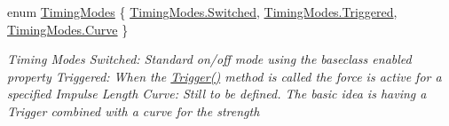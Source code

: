 \begin{DoxyCompactItemize}
enum \hyperlink{class_farseer_physics_1_1_controllers_1_1_abstract_force_controller_a5dc6c4b2c041b7c5c084873d89b4b62b}{Timing\+Modes} \{ \hyperlink{class_farseer_physics_1_1_controllers_1_1_abstract_force_controller_a5dc6c4b2c041b7c5c084873d89b4b62bae95589f4d6357f5680d489ad6997f338}{Timing\+Modes.\+Switched}, 
\hyperlink{class_farseer_physics_1_1_controllers_1_1_abstract_force_controller_a5dc6c4b2c041b7c5c084873d89b4b62ba073b1bbd5b71098e61f7c3b8240a29bf}{Timing\+Modes.\+Triggered}, 
\hyperlink{class_farseer_physics_1_1_controllers_1_1_abstract_force_controller_a5dc6c4b2c041b7c5c084873d89b4b62ba2cb4d4a3f8dacd623fa045a44febd476}{Timing\+Modes.\+Curve}
 \}
\begin{DoxyCompactList}\small\item\em Timing Modes Switched\+: Standard on/off mode using the baseclass enabled property Triggered\+: When the \hyperlink{class_farseer_physics_1_1_controllers_1_1_abstract_force_controller_a2546e91b21ebbd41af7745d8b785611f}{Trigger()} method is called the force is active for a specified Impulse Length Curve\+: Still to be defined. The basic idea is having a Trigger combined with a curve for the strength \end{DoxyCompactList}\end{DoxyCompactItemize}
